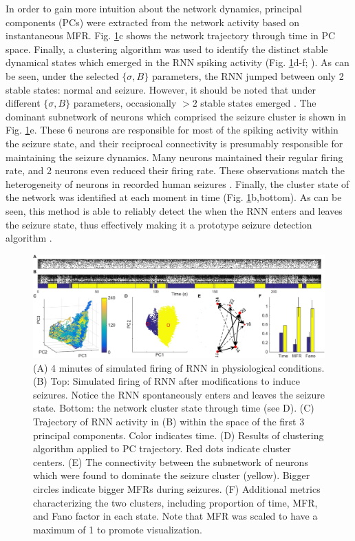 \documentclass[11pt,a4paper,final]{article}
\begin{document}
In order to gain more intuition about the network dynamics, principal components (PCs) were extracted from the network activity based on instantaneous MFR.
Fig. \ref{seizure}c shows the network trajectory through time in PC space.
Finally, a clustering algorithm was used to identify the distinct stable dynamical states which emerged in the RNN spiking activity (Fig. \ref{seizure}d-f; \citet{sasaki07,santaniello14}).
As can be seen, under the selected $\{\sigma,B\}$ parameters, the RNN jumped between only 2 stable states: normal and seizure.
However, it should be noted that under different $\{\sigma,B\}$ parameters, occasionally $>2$ stable states emerged \citep{mazzucato15}.	
The dominant subnetwork of neurons which comprised the seizure cluster is shown in Fig. \ref{seizure}e.
These 6 neurons are responsible for most of the spiking activity within the seizure state, and their reciprocal connectivity is presumably responsible for maintaining the seizure dynamics.
Many neurons maintained their regular firing rate, and 2 neurons even reduced their firing rate.
These observations match the heterogeneity of neurons in recorded human seizures \citep{bower12}.
Finally, the cluster state of the network was identified at each moment in time (Fig. \ref{seizure}b,bottom).
As can be seen, this method is able to reliably detect the when the RNN enters and leaves the seizure state, thus effectively making it a prototype seizure detection algorithm \citep{mormann07,cook13,netoff15}.

\begin{figure}[!ht]
\centering
\includegraphics[width=180mm]{seizure}
\caption[Seizure Induction]{
	(A) 4 minutes of simulated firing of RNN in physiological conditions.
	(B) Top: Simulated firing of RNN after modifications to induce seizures. Notice the RNN spontaneously enters and leaves the seizure state.
	    Bottom: the network cluster state through time (see D).
	(C) Trajectory of RNN activity in (B) within the space of the first 3 principal components. Color indicates time.
	(D) Results of clustering algorithm applied to PC trajectory. Red dots indicate cluster centers.
	(E) The connectivity between the subnetwork of neurons which were found to dominate the seizure cluster (yellow). Bigger circles indicate bigger MFRs during seizures.
	(F) Additional metrics characterizing the two clusters, including proportion of time, MFR, and Fano factor in each state. Note that MFR was scaled to have a maximum of 1 to promote visualization.
}
\label{seizure}
\end{figure}
\end{document}
